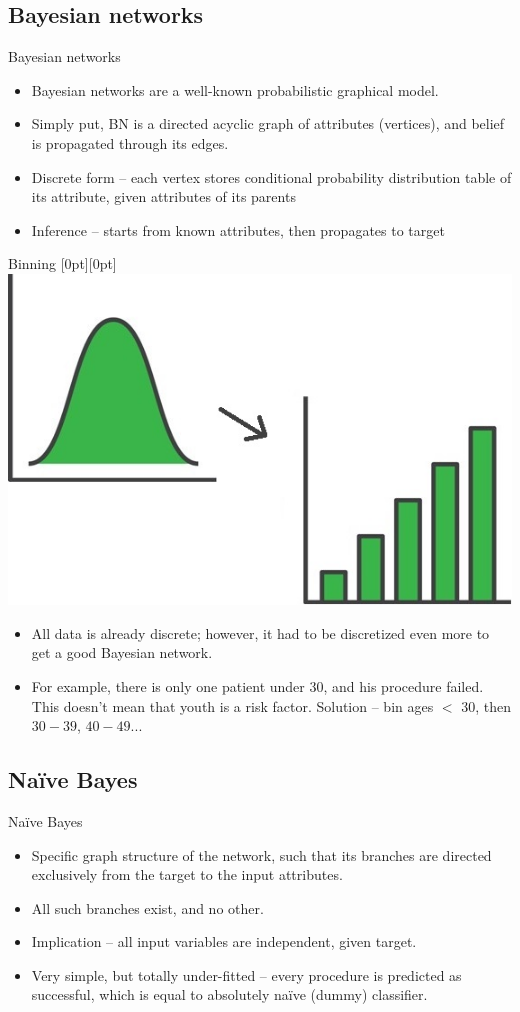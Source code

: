 \documentclass[hyperref={bookmarks=false}]{beamer}
\newcommand{\lenitem}[2][.51\linewidth]{\parbox[t]{#1}{\strut #2\strut}}
\begin{document}
\subsection{Bayesian networks}
\begin{frame}{Bayesian networks}
\begin{itemize}
    \item Bayesian networks are a well-known probabilistic graphical model.
    \item Simply put, BN is a directed acyclic graph of attributes (vertices), and belief is propagated through its edges.
    \item Discrete form -- each vertex stores conditional probability distribution table of its attribute, given attributes of its parents
    \item Inference -- starts from known attributes, then propagates to target
\end{itemize}
\end{frame}

\begin{frame}{Binning}
\mbox{}\hfill\raisebox{-\height}[0pt][0pt]{\includegraphics[width=.42\linewidth]{../slike/binning.jpeg}}
\vspace*{-\baselineskip}

\begin{itemize}
    \item \lenitem{All data is already discrete; however, it had to be discretized even more to get a good Bayesian network.}

    \item \lenitem{For example, there is only one patient under 30, and his procedure failed. This doesn't mean that youth is a risk factor. Solution -- bin ages $<$ 30, then $30-39$, $40-49$...}
\end{itemize}
\end{frame}

\subsection{Naïve Bayes}
\begin{frame}{Naïve Bayes}
\begin{itemize}
    \item Specific graph structure of the network, such that its branches are directed exclusively from the target to the input attributes.
    \item All such branches exist, and no other.
    \item Implication -- all input variables are independent, given target.
    \item Very simple, but totally under-fitted -- every procedure is predicted as successful, which is equal to absolutely naïve (dummy) classifier.
\end{itemize}
\end{frame}
\end{document}
